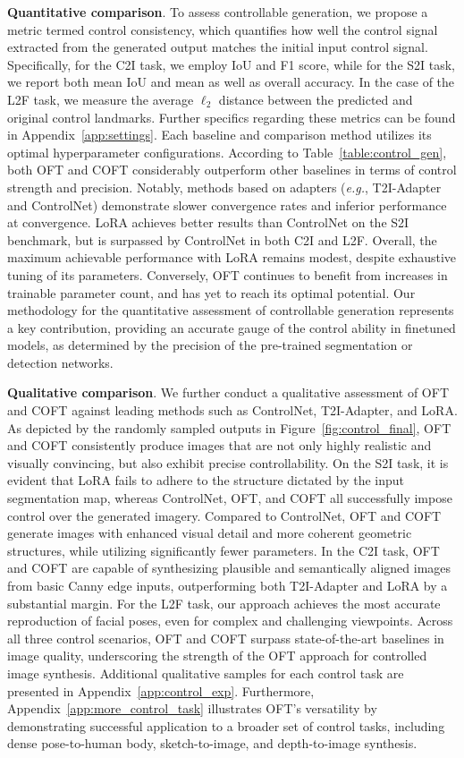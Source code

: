 \textbf{Quantitative comparison}. To assess controllable generation, we propose a metric termed control consistency, which quantifies how well the control signal extracted from the generated output matches the initial input control signal. Specifically, for the C2I task, we employ IoU and F1 score, while for the S2I task, we report both mean IoU and mean as well as overall accuracy. In the case of the L2F task, we measure the average $\ell_2$ distance between the predicted and original control landmarks. Further specifics regarding these metrics can be found in Appendix~\ref{app:settings}. Each baseline and comparison method utilizes its optimal hyperparameter configurations. According to Table~\ref{table:control_gen}, both OFT and COFT considerably outperform other baselines in terms of control strength and precision. Notably, methods based on adapters (\emph{e.g.}, T2I-Adapter and ControlNet) demonstrate slower convergence rates and inferior performance at convergence. LoRA achieves better results than ControlNet on the S2I benchmark, but is surpassed by ControlNet in both C2I and L2F. Overall, the maximum achievable performance with LoRA remains modest, despite exhaustive tuning of its parameters. Conversely, OFT continues to benefit from increases in trainable parameter count, and has yet to reach its optimal potential. Our methodology for the quantitative assessment of controllable generation represents a key contribution, providing an accurate gauge of the control ability in finetuned models, as determined by the precision of the pre-trained segmentation or detection networks.

\textbf{Qualitative comparison}. We further conduct a qualitative assessment of OFT and COFT against leading methods such as ControlNet, T2I-Adapter, and LoRA. As depicted by the randomly sampled outputs in Figure~\ref{fig:control_final}, OFT and COFT consistently produce images that are not only highly realistic and visually convincing, but also exhibit precise controllability. On the S2I task, it is evident that LoRA fails to adhere to the structure dictated by the input segmentation map, whereas ControlNet, OFT, and COFT all successfully impose control over the generated imagery. Compared to ControlNet, OFT and COFT generate images with enhanced visual detail and more coherent geometric structures, while utilizing significantly fewer parameters. In the C2I task, OFT and COFT are capable of synthesizing plausible and semantically aligned images from basic Canny edge inputs, outperforming both T2I-Adapter and LoRA by a substantial margin. For the L2F task, our approach achieves the most accurate reproduction of facial poses, even for complex and challenging viewpoints. Across all three control scenarios, OFT and COFT surpass state-of-the-art baselines in image quality, underscoring the strength of the OFT approach for controlled image synthesis. Additional qualitative samples for each control task are presented in Appendix~\ref{app:control_exp}. Furthermore, Appendix~\ref{app:more_control_task} illustrates OFT's versatility by demonstrating successful application to a broader set of control tasks, including dense pose-to-human body, sketch-to-image, and depth-to-image synthesis.

